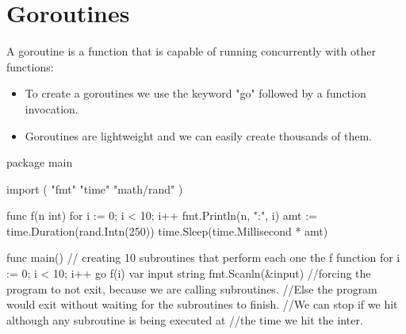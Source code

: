 \documentclass[twoside,a4paper,english]{report}
\begin{document}
\section{Goroutines}
A goroutine is a function that is capable of running concurrently with other functions:
\begin{itemize}
\item To create a goroutines we use the keyword "go" followed by a function invocation.
\item Goroutines are lightweight and we can easily create thousands of them.
\end{itemize}
\begin{go}
package main

import (
  "fmt"
  "time"
  "math/rand"
)

func f(n int) {
  for i := 0; i < 10; i++ {
    fmt.Println(n, ":", i)
    amt := time.Duration(rand.Intn(250))
    time.Sleep(time.Millisecond * amt)
  } 
}

func main() {
    // creating 10 subroutines that perform each one the f function
    for i := 0; i < 10; i++ {
      go f(i) 
    }
    var input string
    fmt.Scanln(&input) //forcing the program to not exit, because we are calling subroutines. 
                       //Else the program would exit without waiting for the subroutines to finish. 
                       //We can stop if we hit although any subroutine is being executed at 
                       //the time we hit the inter.
}
\end{go}
\end{document}
